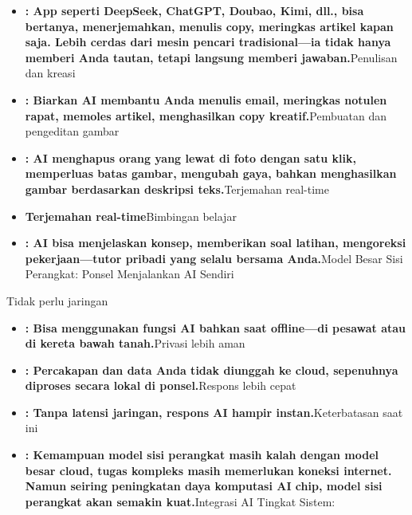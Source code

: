 \begin{itemize}
  \item \textbf{: App seperti DeepSeek, ChatGPT, Doubao, Kimi, dll., bisa bertanya, menerjemahkan, menulis copy, meringkas artikel kapan saja. Lebih cerdas dari mesin pencari tradisional—ia tidak hanya memberi Anda tautan, tetapi langsung memberi jawaban.}Penulisan dan kreasi
  \item \textbf{: Biarkan AI membantu Anda menulis email, meringkas notulen rapat, memoles artikel, menghasilkan copy kreatif.}Pembuatan dan pengeditan gambar
  \item \textbf{: AI menghapus orang yang lewat di foto dengan satu klik, memperluas batas gambar, mengubah gaya, bahkan menghasilkan gambar berdasarkan deskripsi teks.}Terjemahan real-time
  \item \textbf{Terjemahan real-time}Bimbingan belajar
  \item \textbf{: AI bisa menjelaskan konsep, memberikan soal latihan, mengoreksi pekerjaan—tutor pribadi yang selalu bersama Anda.}Model Besar Sisi Perangkat: Ponsel Menjalankan AI Sendiri
\end{itemize}


Tidak perlu jaringan

\begin{itemize}
  \item \textbf{: Bisa menggunakan fungsi AI bahkan saat offline—di pesawat atau di kereta bawah tanah.}Privasi lebih aman
  \item \textbf{: Percakapan dan data Anda tidak diunggah ke cloud, sepenuhnya diproses secara lokal di ponsel.}Respons lebih cepat
  \item \textbf{: Tanpa latensi jaringan, respons AI hampir instan.}Keterbatasan saat ini
  \item \textbf{: Kemampuan model sisi perangkat masih kalah dengan model besar cloud, tugas kompleks masih memerlukan koneksi internet. Namun seiring peningkatan daya komputasi AI chip, model sisi perangkat akan semakin kuat.}Integrasi AI Tingkat Sistem:
\end{itemize}


